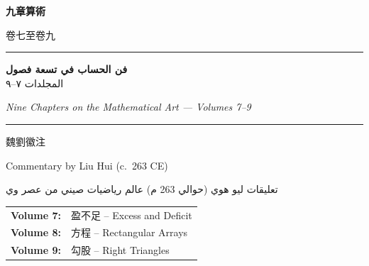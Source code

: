 \documentclass[11pt,a4paper]{article}
\begin{document}
\begin{titlepage}
\begin{center}
\vspace*{1.5cm}

{\fontsize{36}{44}\selectfont\bfseries\color{titlecolor} 九章算術}

\vspace{0.5cm}

{\fontsize{14}{20}\selectfont\color{notecolor} 卷七至卷九}

\vspace{1.5cm}

\rule{0.85\textwidth}{1.5pt}

\vspace{0.8cm}

{\fontsize{22}{30}\selectfont\arabicfont\beginR\color{titlecolor}
\textbf{فن الحساب في تسعة فصول}\\[0.3cm]
{\large المجلدات ٧--٩}\endR}

\vspace{0.4cm}

{\fontsize{14}{20}\selectfont\itshape Nine Chapters on the Mathematical Art --- Volumes 7--9}

\vspace{0.8cm}

\rule{0.85\textwidth}{1.5pt}

\vspace{1.5cm}

{\fontsize{12}{16}\selectfont 魏\quad 劉徽\quad 注}

\vspace{0.3cm}

{\fontsize{10}{14}\selectfont\color{notecolor} Commentary by Liu Hui (c.~263 CE)}

\vspace{0.8cm}

{\fontsize{11}{15}\selectfont\arabicfont\beginR\color{notecolor}
تعليقات ليو هوي (حوالي 263 م) \textbullet{} عالم رياضيات صيني من عصر وي
\endR}

\vspace{1.5cm}

{\fontsize{10}{14}\selectfont\color{notecolor}
\begin{tabular}{rl}
\textbf{Volume 7:} & 盈不足 -- Excess and Deficit \\
\textbf{Volume 8:} & 方程 -- Rectangular Arrays \\
\textbf{Volume 9:} & 勾股 -- Right Triangles \\
\end{tabular}
}


\end{center}
\end{titlepage}
\end{document}
